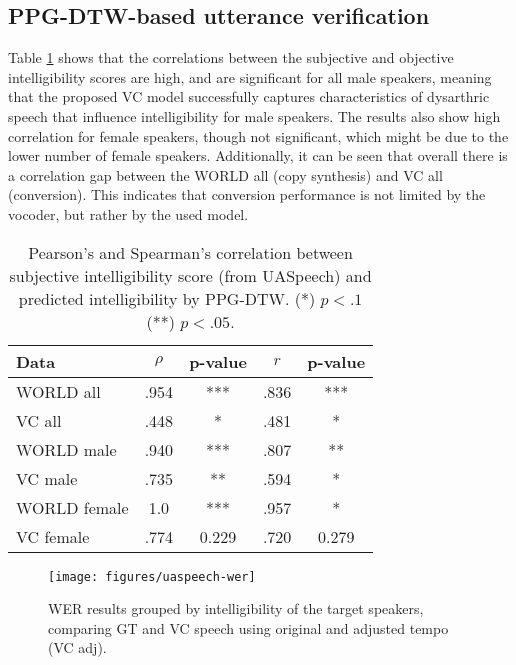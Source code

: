 \documentclass[a4paper]{article}
\begin{document}
\subsection{PPG-DTW-based utterance verification}


Table \ref{tab:results} shows that the correlations between the subjective and objective intelligibility scores are high, and are significant for all male speakers, meaning that the proposed VC model successfully captures characteristics of dysarthric speech that influence intelligibility for male speakers. The results also show high correlation for female speakers, though not significant, which might be due to the lower number of female speakers. Additionally, it can be seen that overall there is a correlation gap between the WORLD all (copy synthesis) and VC all (conversion). This indicates that conversion performance is not limited by the vocoder, but rather by the used model.

\begin{table}[!htb]

  \label{tab:results}
  \centering
  \begin{tabular}{l|cccc}
	\hline
 Data & $\rho$ &  p-value & $r$ & p-value  \\
 \hline
 \hline
  WORLD all & .954 & *** & .836 & *** \\
  VC all & .448 & *  & .481 & * \\
   \hline
    WORLD male & .940 & *** & .807 & ** \\ 
 VC male & .735 & **  &  .594 & * \\
 \hline
  WORLD female & 1.0 & *** & .957 & *  \\  
 VC female & .774 & 0.229  & .720 & 0.279 \\   
 \hline
  \end{tabular}
 
    \caption{Pearson's and Spearman's correlation between subjective intelligibility score (from UASpeech) and predicted intelligibility by PPG-DTW. (*) $p < .1$ (**) $p<.05$.}
\end{table}


\begin{figure}[ht!]
\centering
  \texttt{[image: figures/uaspeech-wer]}
  \caption{WER results grouped by intelligibility of the target speakers, comparing GT
    and VC speech using original and adjusted tempo (VC adj).}
  \label{fig:asr-results}
\end{figure}
\end{document}
